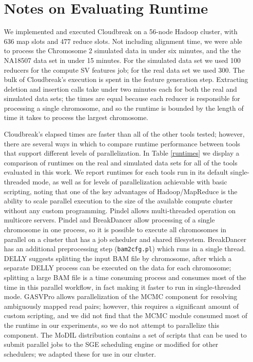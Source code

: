 \section{Notes on Evaluating  Runtime}\label{section_comparing_runtime}

We implemented and executed Cloudbreak on a 56-node Hadoop cluster, with 636 map slots and 477 reduce slots. Not including alignment time, we were able to process the Chromosome 2 simulated data in under six minutes, and the the NA18507 data set in under 15 minutes. For the simulated data set we used 100 reducers for the compute SV features job; for the real data set we used 300. The bulk of Cloudbreak's execution is spent in the feature generation step. Extracting deletion and insertion calls take under two minutes each for both the real and simulated data sets; the times are equal because each reducer is responsible for processing a single chromosome, and so the runtime is bounded by the length of time it takes to process the largest chromosome. 

Cloudbreak's elapsed times are faster than all of the other tools tested; however, there are several ways in which to compare runtime performance between tools that support different levels of parallelization. In Table \ref{runtimes} we display a comparison of runtimes on the real and simulated data sets for all of the tools evaluated in this work. We report runtimes for each tools run in its default single-threaded mode, as well as for levels of parallelization achievable with basic scripting, noting that one of the key advantages of Hadoop/MapReduce is the ability to scale parallel execution to the size of the available compute cluster without any custom programming. Pindel allows multi-threaded operation on multicore servers. Pindel and BreakDancer allow processing of a single chromosome in one process, so it is possible to execute all chromosomes in parallel on a cluster that has a job scheduler and shared filesystem. BreakDancer has an additional preprocessing step (\texttt{bam2cfg.pl}) which runs in a single thread. DELLY suggests splitting the input BAM file by chromosome, after which a separate DELLY process can be executed on the data for each chromosome; splitting a large BAM file is a time consuming process and consumes most of the time in this parallel workflow, in fact making it faster to run in single-threaded mode. GASVPro allows parallelization of the MCMC component for resolving ambiguously mapped read pairs; however, this requires a significant amount of custom scripting, and we did not find that the MCMC module consumed most of the runtime in our experiments, so we do not attempt to parallelize this component. The MoDIL distribution contains a set of scripts that can be used to submit parallel jobs to the SGE scheduling engine or modified for other schedulers; we adapted these for use in our cluster.

